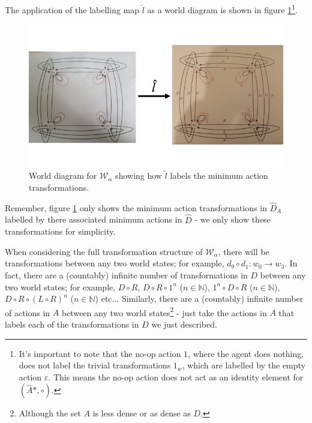 The application of the labelling map $\hat{l}$ as a world diagram is shown in figure \ref{fig:2x2_cyclical_labelling_with_min_actions}\footnote{
	It's important to note that the no-op action $1$, where the agent does nothing, does not label the trivial transformations $1_{w}$, which are labelled by the empty action $\varepsilon$.
	This means the no-op action does not act as an identity element for $(\hat{A}\ast, \circ)$.
}.

\begin{figure}[H]
	\centering
	\includegraphics[width=1\linewidth]{2MathematicalFramework/Images/2x2_cyclical_labelling_with_min_actions.png}
	\caption{
		World diagram for $\mathscr{W}_{\alpha}$ showing how $\hat{l}$ labels the minimum action transformations.
	}
	\label{fig:2x2_cyclical_labelling_with_min_actions}
\end{figure}

Remember, figure \ref{fig:2x2_cyclical_labelling_with_min_actions} only shows the minimum action transformations in $\hat{D}_{A}$ labelled by there associated minimum actions in $\hat{D}$ - we only show these transformations for simplicity.

When considering the full transformation structure of $\mathscr{W}_{\alpha}$, there will be transformations between any two world states; for example, $d_{9} \circ d_{1}: w_{0} \to w_{3}$.
In fact, there are a (countably) infinite number of transformations in $D$ between any two world states; for example, $D \circ R$, $D \circ R \circ 1^{n}$ ($n \in \mathbb{N}$), $1^{n} \circ D \circ R$ ($n \in \mathbb{N}$), $D \circ R \circ (L \circ R)^{n}$ ($n \in \mathbb{N}$) etc...
Similarly, there are a (countably) infinite number of actions in $A$ between any two world states\footnote{Although the set $A$ is less dense or as dense as $D$. } - just take the actions in $A$ that labels each of the transformations in $D$ we just described.

